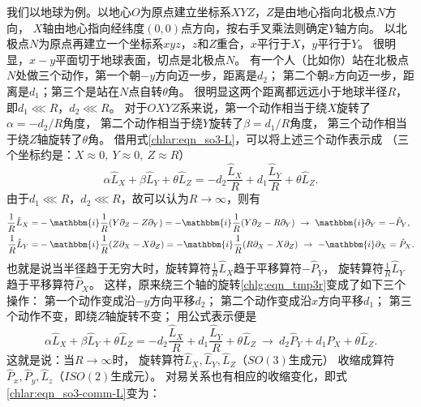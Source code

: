 我们以地球为例。以地心$O$为原点建立坐标系$XYZ$，$Z$是由地心指向北极点$N$方向，
$X$轴由地心指向经纬度$(0,0)$点方向，按右手叉乘法则确定$Y$轴方向。
以北极点$N$为原点再建立一个坐标系$xyz$，$z$和$Z$重合，$x$平行于$X$，$y$平行于$Y$。
很明显，$x-y$平面切于地球表面，切点是北极点$N$。
有一个人（比如你）站在北极点$N$处做三个动作，第一个朝$-y$方向迈一步，距离是$d_2$；
第二个朝$x$方向迈一步，距离是$d_1$；第三个是站在$N$点自转$\theta$角。
很明显这两个距离都远远小于地球半径$R$，即$d_1 \lll R$，$d_2\lll R$。
对于$OXYZ$系来说，第一个动作相当于绕$X$旋转了$\alpha=-d_2/R$角度，
第二个动作相当于绕$Y$旋转了$\beta=d_1/R$角度，
第三个动作相当于绕$Z$轴旋转了$\theta$角。
借用式\eqref{chlar:eqn_so3-L}，可以将上述三个动作表示成
（三个坐标约是：$X\approx 0,\ Y\approx 0,\  Z\approx R$）
\begin{equation}\label{chlg:eqn_tmp3r}
    \alpha \hat{L}_X + \beta \hat{L}_Y + \theta \hat{L}_Z
    =-d_2\frac{\hat{L}_X}{R}  + d_1\frac{\hat{L}_Y}{R}  + \theta \hat{L}_Z.
\end{equation}
由于$d_1 \lll R$，$d_2\lll R$，故可以认为$R\to \infty$，则有
    \begin{align*}
        \frac{1}{R}\hat{L}_X =& -\mathbbm{i} \frac{1}{R} (Y \partial_Z - Z \partial_Y )
        =-\mathbbm{i} \frac{1}{R} (Y \partial_Z - R \partial_Y )
        \ \to\ \mathbbm{i} \partial_Y = -\hat{P}_Y, \\
        \frac{1}{R}\hat{L}_Y =& -\mathbbm{i} \frac{1}{R} (Z \partial_X - X \partial_Z ) 
        =-\mathbbm{i} \frac{1}{R} (R \partial_X - X \partial_Z )
        \ \to\ -\mathbbm{i} \partial_X = \hat{P}_X .
    \end{align*}
也就是说当半径趋于无穷大时，旋转算符$\frac{1}{R}\hat{L}_X$趋于平移算符$-\hat{P}_Y$，
旋转算符$\frac{1}{R}\hat{L}_Y$趋于平移算符$\hat{P}_X$。
这样，原来绕三个轴的旋转\eqref{chlg:eqn_tmp3r}变成了如下三个操作：
第一个动作变成沿$-y$方向平移$d_2$；
第二个动作变成沿$x$方向平移$d_1$；
第三个动作不变，即绕$Z$轴旋转不变；
用公式表示便是
\begin{equation}\label{chlg:eqn_tmp-rpp}
    \alpha \hat{L}_X + \beta \hat{L}_Y + \theta \hat{L}_Z
    =-d_2\frac{\hat{L}_X}{R}  + d_1\frac{\hat{L}_Y}{R}  + \theta \hat{L}_Z
    \ \to \    d_2\hat{P}_Y  + d_1 \hat{P}_X  + \theta \hat{L}_Z .
\end{equation}
这就是说：当$R\to \infty$时，
旋转算符$\hat{L}_X,\hat{L}_Y,\hat{L}_Z$（$SO(3)$生成元）
收缩成算符$\hat{P}_x,\hat{P}_y,\hat{L}_z$（$ISO(2)$生成元）。
对易关系也有相应的收缩变化，即式\eqref{chlar:eqn_so3-comm-L}变为：


